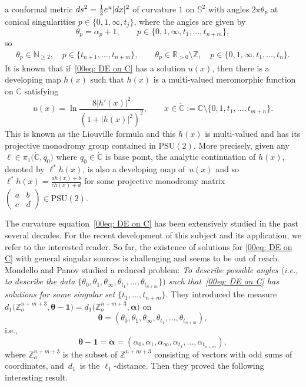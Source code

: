 \documentclass[11pt]{article}
\numberwithin{equation}{section}
\numberwithin{equation}{section}
\def\C{\mathbb C}
\def\R{\mathbb R}
\def\Z{\mathbb Z}
\def\PSU{\mathrm{PSU}}
\def\SM#1#2#3#4{\left(\begin{smallmatrix}#1&#2\\#3&#4\end{smallmatrix}
 \right)}
\begin{document}
a conformal metric ${\rm d}s^2=\frac12{\rm e}^u|{\rm d}x|^2$ of
curvature $1$ on $\mathbb{S}^2$ with angles $2\pi\theta_{p}$ at conical
singularities $p\in\{0,1,\infty, t_j\}$, where the angles are given by
\begin{equation*} %
 \theta_{p}=\alpha_p+1, \qquad
 p\in \{0,1,\infty, t_1,\dots,t_{n+m}\},
\end{equation*}
so
\begin{gather*} %
 \theta_{p}\in \mathbb{N}_{\geq 2}, \quad
 p\in \{t_{n+1},\dots,t_{n+m}\},\qquad
 \theta_p\in \R_{>0}\setminus\mathbb{Z},\quad p\in\{0,1,\infty,t_1,\dots,t_n\}.
\end{gather*}
It is known that if~\eqref{00eq: DE on C} has a solution $u(x)$, then
there is a developing map $h(x)$ such that $h(x)$ is a multi-valued meromorphic
function on $\C$ satisfying
\begin{equation*}%
 u(x)=\ln\frac{8|h'(x)|^2}{(1+|h(x)|^2)^2},\qquad x\in
 \dot{\C}:=\mathbb{C}\setminus\{0,1,t_1,\dots,t_{m+n}\}.
\end{equation*}
This is known as the Liouville formula and this $h(x)$ is multi-valued
and has its projective monodromy group contained in $\PSU(2)$. More
precisely, given any $\ell\in \pi_1\bigl(\dot{\C}, q_0\bigr)$ where
$q_0\in\dot{\C}$ is base point, the analytic continuation of $h(x)$,
denoted by $\ell^*h(x)$, is also a developing map of~$u(x)$ and so
$\ell^*h(x)=\frac{ah(x)+b}{ch(x)+d}$ for some projective monodromy
matrix $\SM{a}{b}{c}{d}\in\PSU(2)$.

The curvature equation~\eqref{00eq: DE on C} has been extensively
studied in the past several decades. For the recent development of
this subject and its application, we refer
\cite{Chai-Lin-Wang,Chen-Lin-weight2,
 Chen-Lin-rectangular,Chen-Lin-Green-function,Chen-Lin-Yang,
Eremenko,Coaxial,EGT,Quadrilateral,Guo-Lin-Yang,
 Lin-Wang-bubbling,Luo-Tian,Mondello-Panov,Mondello-Panov2}
to the interested reader. So far, the existence of solutions for
\eqref{00eq: DE on C} with general singular sources is challenging
and seems to be out of reach.
Mondello and Panov \cite{Mondello-Panov} studied a reduced
problem: \emph{To describe possible angles $($i.e., to describe the data
 $\{\theta_0,
 \theta_1,\theta_\infty,\theta_{t_1},\dots,\theta_{t_{n+m}}\})$ such
 that~\eqref{00eq: DE on C} has solutions for some singular set
 $\{t_1,\dots,t_{n+m}\}$}.
They introduced the measure
$d_1\bigl(\Z_o^{n+m+3},{\boldsymbol\theta-\boldsymbol
 1}\bigr)=d_1\bigl(\Z_o^{n+m+3},{\boldsymbol\alpha}\bigr)$ on
\[
 \boldsymbol \theta=(\theta_0,\theta_1,\theta_\infty,\theta_{t_1},
 \dots,\theta_{t_{n+m}}),
\]
i.e.,
\[
 \boldsymbol\theta-\boldsymbol 1={\boldsymbol\alpha}
 =(\alpha_0,\alpha_1,\alpha_\infty,\alpha_{t_1},\dots,
 \alpha_{t_{n+m}}),
\]
where $\Z_o^{n+m+3}$ is the subset of $\Z^{n+m+3}$ consisting of
vectors with odd sums of coordinates, and~$d_1$~is the
$\ell_1$-distance. Then they proved the following interesting result.
\end{document}
